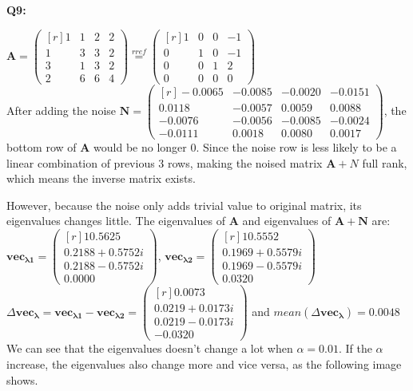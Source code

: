 \documentclass[a4paper,fleqn]{article}
\newcommand{\newvec}[1]{
    \begin{pmatrix*}[r]
        #1
    \end{pmatrix*}
}
\begin{document}
    \newpage
    \Large{\textbf{Q9:}}

    $\mathbf{A}=\newvec{1 &1 &2 &2\\ 1 &3 &3 &2\\ 3 &1 &3 &2\\ 2 &6 &6 &4}\stackrel{rref}{=}\newvec{1&0&0&-1\\0&1&0&-1\\0&0&1&2\\0&0&0&0}$\\
    After adding the noise $\mathbf{N}=\newvec{-0.0065&-0.0085&-0.0020&-0.0151\\0.0118&-0.0057&0.0059&0.0088\\-0.0076&-0.0056&-0.0085&-0.0024\\-0.0111&0.0018&0.0080&0.0017}$, the bottom row of $\mathbf{A}$ would be no longer 0. Since the noise row is less likely to be a linear combination of previous 3 rows, making the noised matrix $\mathbf{A}+N$ full rank, which means the inverse matrix exists.  

    \noindent However, because the noise only adds trivial value to original matrix, its eigenvalues changes little. The eigenvalues of $\mathbf{A}$ and eigenvalues of $\mathbf{A+N}$ are:\\
    $\mathbf{vec_{\lambda 1}}=\newvec{10.5625\\0.2188+0.5752i\\0.2188-0.5752i\\0.0000}$, $\mathbf{vec_{\lambda 2}}=\newvec{10.5552\\0.1969 + 0.5579i\\0.1969 - 0.5579i \\0.0320}$ \\
    $\Delta\mathbf{vec_\lambda}=\mathbf{vec_{\lambda 1}}-\mathbf{vec_{\lambda 2}}=\newvec{0.0073\\0.0219 + 0.0173i\\0.0219 - 0.0173i\\-0.0320}$ and $mean(\Delta\mathbf{vec_\lambda})=0.0048$ \\
    We can see that the eigenvalues doesn't change a lot when $\alpha=0.01$. If the $\alpha$ increase, the eigenvalues also change more and vice versa, as the following image shows.
    
\end{document}
